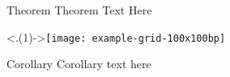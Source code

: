 \documentclass{beamer}
\begin{document}
    \begin{frame}
        \begin{block}{Theorem}
            Theorem Text Here
        \end{block}

        \vfill \pause 

        \begin{example} 
            \centering
            \visible<.(1)->{\texttt{[image: example-grid-100x100bp]}}
        \end{example}

        \vfill \pause

        \begin{block}{Corollary}
            Corollary text here
        \end{block}        

    \end{frame}
\end{document}
